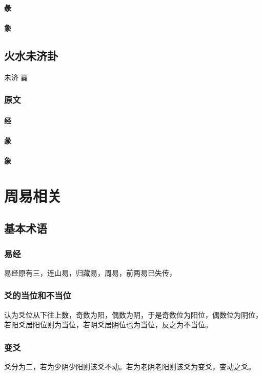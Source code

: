 \documentclass[12pt,oneside]{book}
\begin{document}
\subsection{彖}

\subsection{象}

\chapter{火水未济卦}
未济 {\Large ䷿}
\section{原文}

\subsection{经}

\subsection{彖}

\subsection{象}





\part{周易相关}
\chapter{基本术语}
\section{易经}
易经原有三，连山易，归藏易，周易，前两易已失传，

\section{爻的当位和不当位}
认为爻位从下往上数，奇数为阳，偶数为阴，于是奇数位为阳位，偶数位为阴位，若阳爻居阳位则为当位，若阴爻居阴位也为当位，反之为不当位。


\section{变爻}
爻分为二，若为少阴少阳则该爻不动。若为老阴老阳则该爻为变爻，变动之爻。
\end{document}
